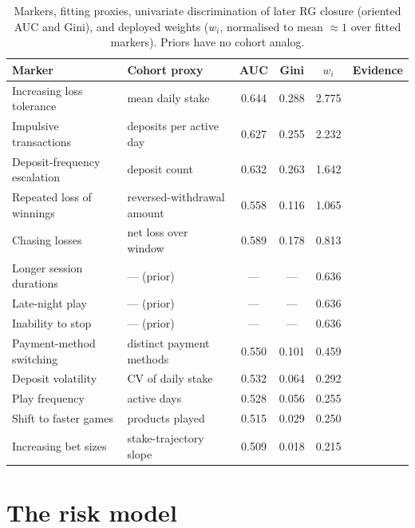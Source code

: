\documentclass[11pt]{article}
\begin{document}
\begin{table}[t]
\centering\small
\caption{Markers, fitting proxies, univariate discrimination of later RG closure
(oriented AUC and Gini), and deployed weights ($w_i$, normalised to mean ${\approx}1$
over fitted markers). Priors have no cohort analog.}
\label{tab:markers}
\begin{tabular}{@{}llcccl@{}}
\toprule
Marker & Cohort proxy & AUC & Gini & $w_i$ & Evidence \\
\midrule
Increasing loss tolerance & mean daily stake & 0.644 & 0.288 & 2.775 & \citep{braverman2012} \\
Impulsive transactions & deposits per active day & 0.627 & 0.255 & 2.232 & \citep{haeusler2016,percy2016} \\
Deposit-frequency escalation & deposit count & 0.632 & 0.263 & 1.642 & \citep{haeusler2016,finkenwirth2021} \\
Repeated loss of winnings & reversed-withdrawal amount & 0.558 & 0.116 & 1.065 & \citep{haeusler2016,gray2012} \\
Chasing losses & net loss over window & 0.589 & 0.178 & 0.813 & \citep{braverman2012,gray2012} \\
Longer session durations & --- (prior) & --- & --- & 0.636 & \citep{ferris2001} \\
Late-night play & --- (prior) & --- & --- & 0.636 & \citep{ferris2001} \\
Inability to stop & --- (prior) & --- & --- & 0.636 & \citep{ferris2001} \\
Payment-method switching & distinct payment methods & 0.550 & 0.101 & 0.459 & \citep{haeusler2016,hopfgartner2023} \\
Deposit volatility & CV of daily stake & 0.532 & 0.064 & 0.292 & \citep{braverman2012} \\
Play frequency & active days & 0.528 & 0.056 & 0.255 & \citep{labrie2007,braverman2012} \\
Shift to faster games & products played & 0.515 & 0.029 & 0.250 & \citep{braverman2013,laplante2014} \\
Increasing bet sizes & stake-trajectory slope & 0.509 & 0.018 & 0.215 & \citep{braverman2012} \\
\bottomrule
\end{tabular}
\end{table}

\section{The risk model}\label{sec:model}
\end{document}
